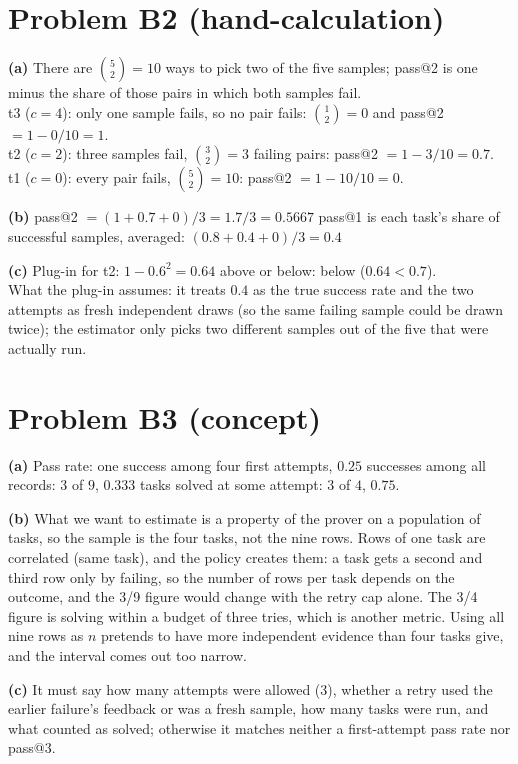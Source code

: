 \documentclass[11pt]{article}
\begin{document}
\section*{Problem B2 (hand-calculation)}\label{ans:B2}
\begin{answer}
\textbf{(a)} There are $\binom{5}{2} = 10$ ways to pick two of the five samples;
pass@2 is one minus the share of those pairs in which both samples fail. \\
t3 ($c = 4$): only one sample fails, so no pair fails: $\binom{1}{2} = 0$ and
pass@2 $= 1 - 0/10 = 1$. \\
t2 ($c = 2$): three samples fail, $\binom{3}{2} = 3$ failing pairs:
pass@2 $= 1 - 3/10 = 0.7$. \\
t1 ($c = 0$): every pair fails, $\binom{5}{2} = 10$: pass@2 $= 1 - 10/10 = 0$.

\textbf{(b)} pass@2 $= (1 + 0.7 + 0)/3 = 1.7/3 = 0.5667$ \quad pass@1 is each task's
share of successful samples, averaged: $(0.8 + 0.4 + 0)/3 = 0.4$

\textbf{(c)} Plug-in for t2: $1 - 0.6^2 = 0.64$ \quad above or below: below
($0.64 < 0.7$). \\
What the plug-in assumes: it treats $0.4$ as the true success rate and the two
attempts as fresh independent draws (so the same failing sample could be drawn
twice); the estimator only picks two different samples out of the five that
were actually run.
\end{answer}

\section*{Problem B3 (concept)}\label{ans:B3}
\begin{answer}
\textbf{(a)} Pass rate: one success among four first attempts, $0.25$ \quad
successes among all records: $3$ of $9$, $0.333$ \quad tasks solved at some
attempt: $3$ of $4$, $0.75$.

\textbf{(b)} What we want to estimate is a property of the prover on a
population of tasks, so the sample is the four tasks, not the nine rows. Rows
of one task are correlated (same task), and the policy creates them: a task
gets a second and third row only by failing, so the number of rows per task
depends on the outcome, and the 3/9 figure would change with the retry cap
alone. The 3/4 figure is solving within a budget of three tries, which is
another metric. Using all nine rows as $n$ pretends to have more independent
evidence than four tasks give, and the interval comes out too narrow.

\textbf{(c)} It must say how many attempts were allowed (3), whether a retry
used the earlier failure's feedback or was a fresh sample, how many tasks were
run, and what counted as solved; otherwise it matches neither a first-attempt
pass rate nor pass@3.
\end{answer}
\end{document}
